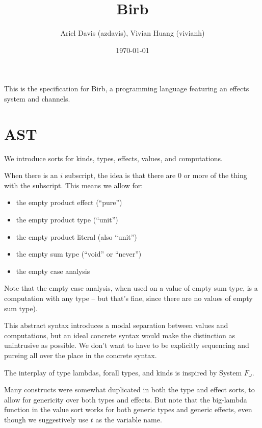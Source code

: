 \documentclass[12pt]{article}
\title{Birb}
\author{Ariel Davis (azdavis), Vivian Huang (vivianh)}
\date{\today}
\begin{document}
\maketitle

This is the specification for Birb, a programming language featuring an effects
system and channels.

\newpage
\section{AST}

We introduce sorts for kinds, types, effects, values, and computations.

When there is an $i$ subscript, the idea is that there are 0 or more of the
thing with the subscript. This means we allow for:
\begin{itemize}
\item the empty product effect (``pure'')
\item the empty product type (``unit'')
\item the empty product literal (also ``unit'')
\item the empty sum type (``void'' or ``never'')
\item the empty case analysis
\end{itemize}

Note that the empty case analysis, when used on a value of empty sum type, is a
computation with any type -- but that's fine, since there are no values of empty
sum type).

This abstract syntax introduces a modal separation between values and
computations, but an ideal concrete syntax would make the distinction as
unintrusive as possible. We don't want to have to be explicitly sequencing and
\textsf{pure}ing all over the place in the concrete syntax.

The interplay of type lambdas, forall types, and kinds is inspired by System
$F_\omega$.

Many constructs were somewhat duplicated in both the type and effect sorts, to
allow for genericity over both types and effects. But note that the big-lambda
function in the value sort works for both generic types and generic effects,
even though we suggestively use $t$ as the variable name.
\end{document}
